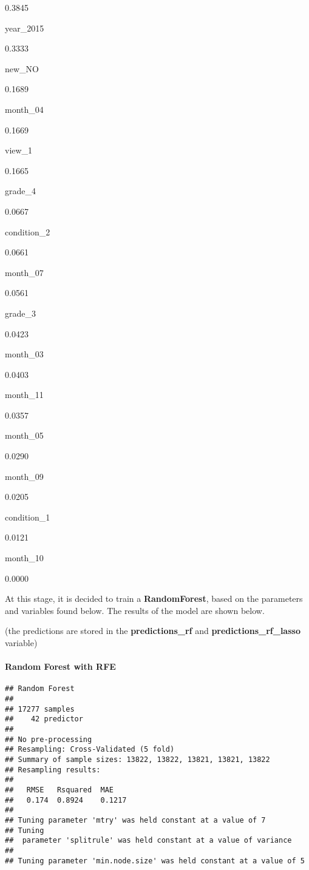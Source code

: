 \documentclass[]{article}
\let\oldparagraph\paragraph
\renewcommand{\paragraph}[1]{\oldparagraph{#1}\mbox{}}
\begin{document}
0.3845

year\_2015

0.3333

new\_NO

0.1689

month\_04

0.1669

view\_1

0.1665

grade\_4

0.0667

condition\_2

0.0661

month\_07

0.0561

grade\_3

0.0423

month\_03

0.0403

month\_11

0.0357

month\_05

0.0290

month\_09

0.0205

condition\_1

0.0121

month\_10

0.0000

At this stage, it is decided to train a \textbf{RandomForest}, based on
the parameters and variables found below. The results of the model are
shown below.

(the predictions are stored in the \textbf{predictions\_rf} and
\textbf{predictions\_rf\_lasso} variable)

\hypertarget{random-forest-with-rfe}{%
\paragraph{Random Forest with RFE}\label{random-forest-with-rfe}}

\begin{verbatim}
## Random Forest 
## 
## 17277 samples
##    42 predictor
## 
## No pre-processing
## Resampling: Cross-Validated (5 fold) 
## Summary of sample sizes: 13822, 13822, 13821, 13821, 13822 
## Resampling results:
## 
##   RMSE   Rsquared  MAE   
##   0.174  0.8924    0.1217
## 
## Tuning parameter 'mtry' was held constant at a value of 7
## Tuning
##  parameter 'splitrule' was held constant at a value of variance
## 
## Tuning parameter 'min.node.size' was held constant at a value of 5
\end{verbatim}
\end{document}
